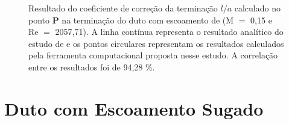 \newpage
\begin{figure}[ht!]
\centering
  \caption[Coeficiente de Correção da Terminação $l/a$ com Escoamento de Exaustão (M $=$ 0,15)]{Resultado do coeficiente de correção da terminação $l/a$ calculado no ponto $\textbf{P}$ na terminação do duto com escoamento de (M $=$ 0,15 e Re $=$ 2057,71). A linha contínua representa o resultado analítico do estudo de  e os pontos circulares representam os resultados calculados pela ferramenta computacional proposta nesse estudo. A correlação entre os resultados foi de 94,28 \%.}
  \label{fig:loa_boca_015}
\end{figure}


\newpage
\section{Duto com Escoamento Sugado}